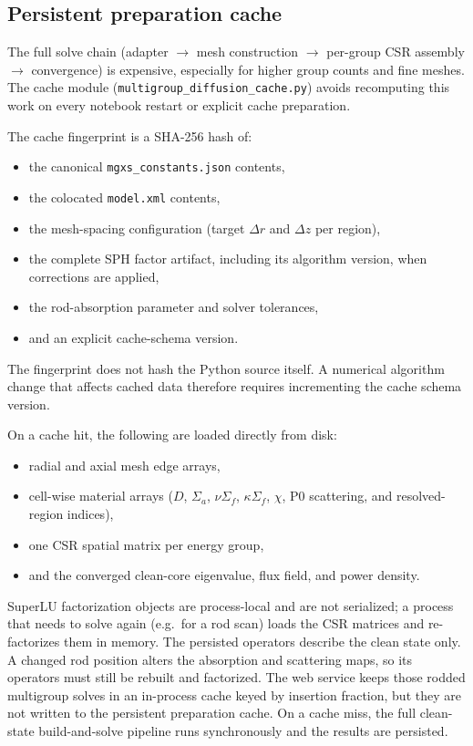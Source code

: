\documentclass[11pt]{article}
\begin{document}
\subsection{Persistent preparation cache}

The full solve chain (adapter $\to$ mesh construction $\to$ per-group CSR
assembly $\to$ convergence) is expensive, especially for higher group counts
and fine meshes.  The cache module
(\texttt{multigroup\_diffusion\_cache.py}) avoids recomputing this work on
every notebook restart or explicit cache preparation.

The cache fingerprint is a SHA-256 hash of:
\begin{itemize}
  \item the canonical \texttt{mgxs\_constants.json} contents,
  \item the colocated \texttt{model.xml} contents,
  \item the mesh-spacing configuration (target $\Delta r$ and $\Delta z$ per
        region),
  \item the complete SPH factor artifact, including its algorithm version,
        when corrections are applied,
  \item the rod-absorption parameter and solver tolerances,
  \item and an explicit cache-schema version.
\end{itemize}

The fingerprint does not hash the Python source itself.  A numerical algorithm
change that affects cached data therefore requires incrementing the cache
schema version.

On a cache hit, the following are loaded directly from disk:
\begin{itemize}
  \item radial and axial mesh edge arrays,
  \item cell-wise material arrays ($D$, $\Sigma_a$, $\nu\Sigma_f$,
        $\kappa\Sigma_f$, $\chi$, P0 scattering, and resolved-region indices),
  \item one CSR spatial matrix per energy group,
  \item and the converged clean-core eigenvalue, flux field, and power density.
\end{itemize}

SuperLU factorization objects are process-local and are not serialized; a
process that needs to solve again (e.g.\ for a rod scan) loads the CSR
matrices and re-factorizes them in memory.  The persisted operators describe
the clean state only.  A changed rod position alters the absorption and
scattering maps, so its operators must still be rebuilt and factorized.  The
web service keeps those rodded multigroup solves in an in-process cache keyed
by insertion fraction, but they are not written to the persistent preparation
cache.  On a cache miss, the full clean-state build-and-solve pipeline runs
synchronously and the results are persisted.
\end{document}
